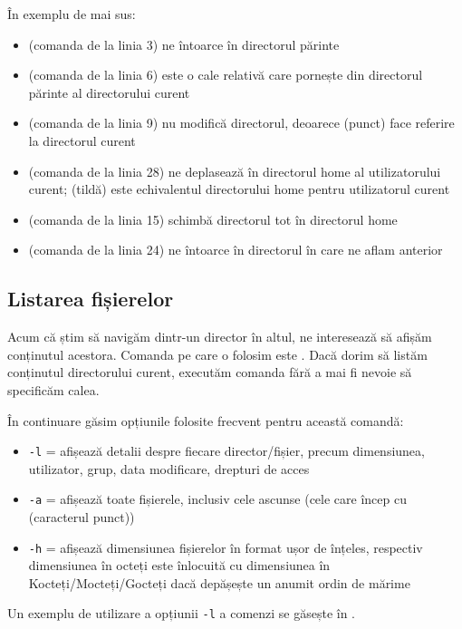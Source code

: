 În exemplu de mai sus:
\begin{itemize}
  \item {} (comanda de la linia 3) ne întoarce în directorul părinte
  \item {} (comanda de la linia 6) este o cale relativă care pornește din directorul părinte al directorului curent
  \item {} (comanda de la linia 9) nu modifică directorul, deoarece  (punct) face referire la directorul curent
  \item {} (comanda de la linia 28) ne deplasează în directorul home al utilizatorului curent; \file{\textasciitilde} (tildă) este echivalentul directorului home pentru utilizatorul curent
  \item {} (comanda de la linia 15) schimbă directorul tot în directorul home
  \item {} (comanda de la linia 24) ne întoarce în directorul în care ne aflam anterior
\end{itemize}

\subsection{Listarea fișierelor}
\label{sec:fs:ls}

Acum că știm să navigăm dintr-un director în altul, ne interesează să afișăm conținutul acestora. Comanda pe care o folosim este . Dacă dorim să listăm conținutul directorului curent, executăm comanda  fără a mai fi nevoie să specificăm calea.

În continuare găsim opțiunile folosite frecvent pentru această comandă:

\begin{itemize}
  \item \texttt{-l} = afișează detalii despre fiecare director/fișier, precum dimensiunea, utilizator, grup, data modificare, drepturi
    de acces
  \item \texttt{-a} = afișează toate fișierele, inclusiv cele ascunse (cele care încep cu  (caracterul punct))
  \item \texttt{-h} = afișează dimensiunea fișierelor în format ușor de înțeles, respectiv dimensiunea în octeți este înlocuită cu dimensiunea în Kocteți/Mocteți/Gocteți dacă depășește un anumit ordin de mărime
\end{itemize}

Un exemplu de utilizare a opțiunii \texttt{-l} a comenzi  se găsește în .

